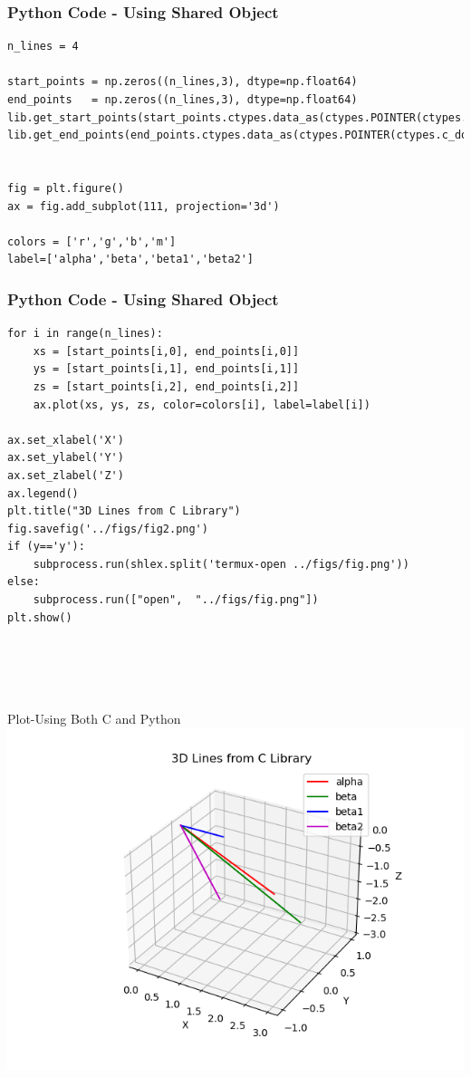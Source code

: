 \documentclass{beamer}
\begin{document}
\begin{frame}[fragile]
    \frametitle{Python Code - Using Shared Object}
    \begin{lstlisting}
n_lines = 4

start_points = np.zeros((n_lines,3), dtype=np.float64)
end_points   = np.zeros((n_lines,3), dtype=np.float64)
lib.get_start_points(start_points.ctypes.data_as(ctypes.POINTER(ctypes.c_double)))
lib.get_end_points(end_points.ctypes.data_as(ctypes.POINTER(ctypes.c_double)))


fig = plt.figure()
ax = fig.add_subplot(111, projection='3d')

colors = ['r','g','b','m']
label=['alpha','beta','beta1','beta2']

\end{lstlisting}
\end{frame}
\begin{frame}[fragile]
    \frametitle{Python Code - Using Shared Object}
    \begin{lstlisting}
for i in range(n_lines):
    xs = [start_points[i,0], end_points[i,0]]
    ys = [start_points[i,1], end_points[i,1]]
    zs = [start_points[i,2], end_points[i,2]]
    ax.plot(xs, ys, zs, color=colors[i], label=label[i])

ax.set_xlabel('X')
ax.set_ylabel('Y')
ax.set_zlabel('Z')
ax.legend()
plt.title("3D Lines from C Library")
fig.savefig('../figs/fig2.png')
if (y=='y'):
    subprocess.run(shlex.split('termux-open ../figs/fig.png'))
else:
    subprocess.run(["open",  "../figs/fig.png"])
plt.show()





\end{lstlisting}
\end{frame}



\begin{frame}{Plot-Using Both C and Python}
    \centering
    \includegraphics[width=\columnwidth, height=0.8\textheight, keepaspectratio]{figs/fig2.png}     
\end{frame}
\end{document}

